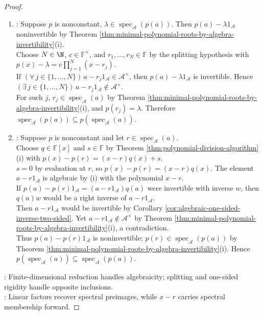 \begin{theorem}
\begin{proof}
\begin{enumerate}[label=(\roman*)]
\begin{enumerate}[label=(\alph*)]
\item {}: Suppose $p$ is nonconstant, $\lambda\in\operatorname{spec}_{\mathcal{A}}(p(a))$. Then $p(a)-\lambda1_{\mathcal{A}}$ noninvertible by Theorem \ref{thm:minimal-polynomial-roots-by-algebra-invertibility}(i).\\
Choose $N\in\N$, $c\in\mathbb{F}^{\times}$, and $r_1,\ldots,r_N\in\mathbb{F}$ by the splitting hypothesis with $p(x)-\lambda=c\prod\limits_{j=1}^{N}(x-r_j)$.\\
If $(\forall\,j\in\{1,\ldots,N\})\,a-r_j1_{\mathcal{A}}\in\mathcal{A}^{\times}$, then $p(a)-\lambda1_{\mathcal{A}}$ is invertible. Hence $(\exists\,j\in\{1,\ldots,N\})\,a-r_j1_{\mathcal{A}}\notin\mathcal{A}^{\times}$.\\
For such $j$, $r_j\in\operatorname{spec}_{\mathcal{A}}(a)$ by Theorem \ref{thm:minimal-polynomial-roots-by-algebra-invertibility}(i), and $p(r_j)=\lambda$. Therefore $\operatorname{spec}_{\mathcal{A}}(p(a))\subseteq p(\operatorname{spec}_{\mathcal{A}}(a))$.
\item {}: Suppose $p$ is nonconstant and let $r\in\operatorname{spec}_{\mathcal{A}}(a)$.\\
Choose $q\in\mathbb{F}[x]$ and $s\in\mathbb{F}$ by Theorem \ref{thm:polynomial-division-algorithm}(i) with $p(x)-p(r)=(x-r)q(x)+s$.\\
$s=0$ by evaluation at $r$, so $p(x)-p(r)=(x-r)q(x)$. The element $a-r1_{\mathcal{A}}$ is algebraic by (i) with the polynomial $x-r$.\\
If $p(a)-p(r)1_{\mathcal{A}}=(a-r1_{\mathcal{A}})q(a)$ were invertible with inverse $w$, then $q(a)w$ would be a right inverse of $a-r1_{\mathcal{A}}$.\\
Then $a-r1_{\mathcal{A}}$ would be invertible by Corollary \ref{cor:algebraic-one-sided-inverse-two-sided}. Yet $a-r1_{\mathcal{A}}\notin\mathcal{A}^{\times}$ by Theorem \ref{thm:minimal-polynomial-roots-by-algebra-invertibility}(i), a contradiction.\\
Thus $p(a)-p(r)1_{\mathcal{A}}$ is noninvertible; $p(r)\in\operatorname{spec}_{\mathcal{A}}(p(a))$ by Theorem \ref{thm:minimal-polynomial-roots-by-algebra-invertibility}(i). Hence $p(\operatorname{spec}_{\mathcal{A}}(a))\subseteq\operatorname{spec}_{\mathcal{A}}(p(a))$.
\end{enumerate}
\end{enumerate}
: Finite-dimensional reduction handles algebraicity; splitting and one-sided rigidity handle opposite inclusions.\\
: Linear factors recover spectral preimages, while $x-r$ carries spectral membership forward.
\end{proof}
\end{theorem}

